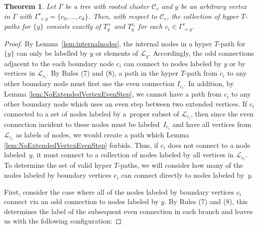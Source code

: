 \documentclass[pdftex]{sigma}
\numberwithin{equation}{section}
\newtheorem{Theorem}{Theorem}[section]
\begin{document}
\begin{Theorem}\label{thm:TPathOneVertex}
Let $\Gamma$ be a tree with rooted cluster $\mathcal{C}_v$ and $y$ be an arbitrary vertex in $\Gamma$ with $\Gamma^{v}_{\lessdot y} = \{ c_0, \dots, c_d \}$. Then, with respect to $\mathcal{C}_v$, the collection of hyper $T$-paths for $\{ y \}$ consists exactly of $T_y^+$ and $T_{y}^{c_i}$ for each $c_i \in \Gamma^{v}_{\lessdot y}$.
\end{Theorem}
\begin{proof}
By Lemma~\ref{lem:internalnodes}, the internal nodes in a hyper $T$-path for $\{y\}$ can only be labelled by $y$ or elements of $\mathcal{L}_y$. Accordingly, the odd connections adjacent to the each boundary node $c_i$ can connect to nodes labeled by $y$ or by vertices in $\mathcal{L}_{c_i}$. By Rules (7) and (8), a path in the hyper $T$-path from $c_i$ to any other boundary node must first use the even connection $I_{c_i}$. In addition, by Lemma \ref{lem:NoExtendedVertexEvenStep}, we cannot have a path from $c_i$ to any other boundary node which uses an even step between two extended vertices. If $c_i$ connected to a set of nodes labeled by a~proper subset of $\mathcal{L}_{c_i}$, then since the even connection incident to these nodes must be labeled~$I_{c_i}$ and have all vertices from $\mathcal{L}_{c_i}$ as labels of nodes, we would create a path which Lemma \ref{lem:NoExtendedVertexEvenStep} forbids. Thus, if $c_i$ does not connect to a node labeled~$y$, it must connect to a collection of nodes labeled by all vertices in $\mathcal{L}_{c_i}$. To determine the set of valid hyper $T$-paths, we will consider how many of the nodes labeled by boundary vertices $c_i$ can connect directly to nodes labeled by~$y$.


First, consider the case where all of the nodes labeled by boundary vertices $c_i$ connect via an odd connection to nodes labeled by $y$. By Rules (7) and (8), this determines the label of the subsequent even connection in each branch and leaves us with the following configuration:


\end{proof}
\end{document}
